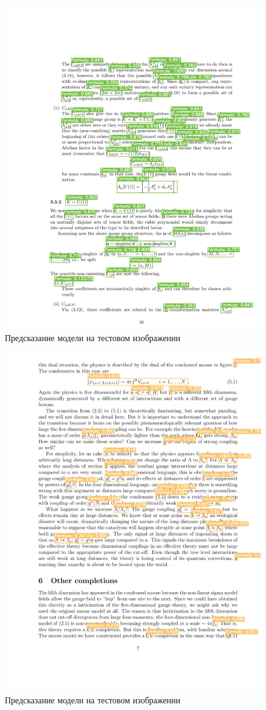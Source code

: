 \begin{figure}
    \includegraphics[scale=0.75]{img/train/test_1.png}
    \caption{Предсказание модели на тестовом изображении}
    \label{train_test_1}
\end{figure}

\begin{figure}
    \includegraphics[scale=0.75]{img/train/test_2.png}
    \caption{Предсказание модели на тестовом изображении}
    \label{train_test_2}
\end{figure}